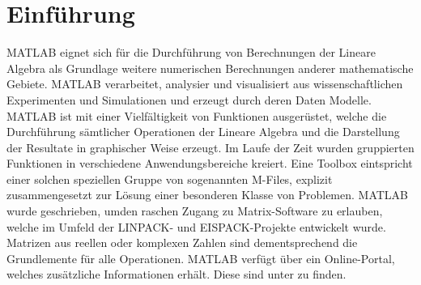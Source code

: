 \section{Einführung}
MATLAB eignet sich für die Durchführung von Berechnungen der Lineare Algebra als Grundlage weitere numerischen Berechnungen anderer mathematische Gebiete.
\newline\newline
MATLAB verarbeitet, analysier und visualisiert aus wissenschaftlichen Experimenten und Simulationen und erzeugt durch deren Daten Modelle.
\newline\newline
MATLAB ist mit einer Vielfältigkeit von Funktionen ausgerüstet, welche die Durchführung sämtlicher Operationen der Lineare Algebra und die Darstellung der Resultate in graphischer Weise erzeugt. Im Laufe der Zeit wurden gruppierten Funktionen in verschiedene Anwendungsbereiche kreiert. Eine Toolbox eintspricht einer solchen speziellen Gruppe von sogenannten M-Files, explizit zusammengesetzt zur Lösung einer besonderen Klasse von Problemen.
\newline\newline
MATLAB wurde geschrieben, umden raschen Zugang zu Matrix-Software zu erlauben, welche im Umfeld der LINPACK- und EISPACK-Projekte entwickelt wurde. Matrizen aus reellen oder komplexen Zahlen sind dementsprechend die Grundlemente für alle Operationen.
\newline\newline
MATLAB verfügt über ein Online-Portal, welches zusätzliche Informationen erhält. Diese sind unter  zu finden.
